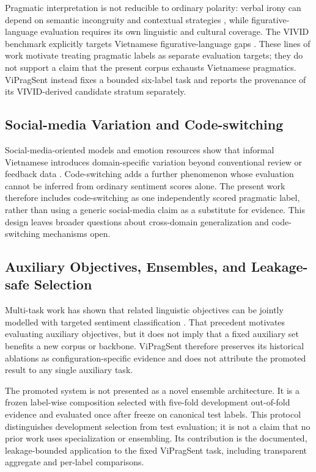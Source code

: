 Pragmatic interpretation is not reducible to ordinary polarity: verbal irony can depend on semantic incongruity and contextual strategies \citep{ghosh-etal-2019-verbal-irony}, while figurative-language evaluation requires its own linguistic and cultural coverage. The VIVID benchmark explicitly targets Vietnamese figurative-language gaps \citep{rem-lab-2026-vivid}. These lines of work motivate treating pragmatic labels as separate evaluation targets; they do not support a claim that the present corpus exhausts Vietnamese pragmatics. ViPragSent instead fixes a bounded six-label task and reports the provenance of its VIVID-derived candidate stratum separately.

\subsection{Social-media Variation and Code-switching}

Social-media-oriented models and emotion resources show that informal Vietnamese introduces domain-specific variation beyond conventional review or feedback data \citep{nguyen-etal-2023-visobert,ho-etal-2020-uit-vsmec,tran-etal-2026-vigoemotions}. Code-switching adds a further phenomenon whose evaluation cannot be inferred from ordinary sentiment scores alone. The present work therefore includes code-switching as one independently scored pragmatic label, rather than using a generic social-media claim as a substitute for evidence. This design leaves broader questions about cross-domain generalization and code-switching mechanisms open.

\subsection{Auxiliary Objectives, Ensembles, and Leakage-safe Selection}

Multi-task work has shown that related linguistic objectives can be jointly modelled with targeted sentiment classification \citep{moore-barnes-2021-multi}. That precedent motivates evaluating auxiliary objectives, but it does not imply that a fixed auxiliary set benefits a new corpus or backbone. ViPragSent therefore preserves its historical ablations as configuration-specific evidence and does not attribute the promoted result to any single auxiliary task.

The promoted system is not presented as a novel ensemble architecture. It is a frozen label-wise composition selected with five-fold development out-of-fold evidence and evaluated once after freeze on canonical test labels. This protocol distinguishes development selection from test evaluation; it is not a claim that no prior work uses specialization or ensembling. Its contribution is the documented, leakage-bounded application to the fixed ViPragSent task, including transparent aggregate and per-label comparisons.

